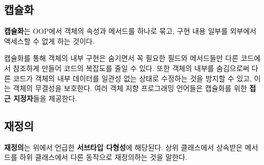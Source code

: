 \subsection{캡슐화}
\textbf{캡슐화}는 OOP에서 객체의 속성과 메서드를 하나로 묶고, 구현 내용 일부를 외부에서 액세스할 수 없게 하는 것이다.

캡슐화를 통해 객체의 내부 구현은 숨기면서 꼭 필요한 필드와 메서드들만 다른 코드에서 참조하게 만들어 코드의 복잡도를 줄일 수 있다. 또한 객체의 내부를 숨김으로써 다른 코드가 객체의 내부 데이터를 일관성 없는 상태로 수정하는 것을 방지할 수 있고, 이는 객체의 무결성을 보호한다. 여러 객체 지향 프로그래밍 언어들은 캡슐화를 위한 \textbf{접근 지정자}들을 제공한다.

\subsection{재정의}
\textbf{재정의}는 위에서 언급한 \textbf{서브타입 다형성}에 해당된다. 상위 클래스에서 상속받은 메서드를 하위 클래스에서 다른 동작으로 재정의하는 것을 말한다.


